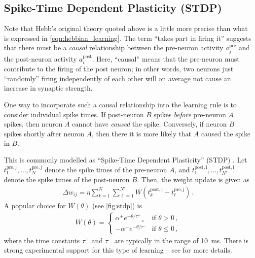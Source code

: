 \documentclass[10pt,letterpaper,oneside]{article}
\begin{document}
\subsection{Spike-Time Dependent Plasticity (STDP)}

Note that Hebb's original theory quoted above is a little more precise than what is expressed in \cref{eqn:hebbian_learning}. The term \enquote{takes part in firing it} suggests that there must be a \emph{causal} relationship between the pre-neuron activity $a_j^\mathrm{pre}$ and the post-neuron activity $a_i^\mathrm{post}$. Here, \enquote{causal} means that the pre-neuron must contribute to the firing of the post neuron; in other words, two neurons just \enquote{randomly} firing independently of each other will on average not cause an increase in synaptic strength.

One way to incorporate such a causal relationship into the learning rule is to consider individual spike times. If post-neuron $B$ spikes \emph{before} pre-neuron $A$ spikes, then neuron $A$ cannot have \emph{caused} the spike. Conversely, if neuron $B$ spikes shortly after neuron $A$, then there it is more likely that $A$ caused the spike in $B$.

This is commonly modelled as \enquote{Spike-Time Dependent Plasticity} (STDP) \cite{sjostrom2010spiketiming}. Let $t^\mathrm{pre,j}_1, \ldots, t^\mathrm{pre,j}_N$ denote the spike times of the pre-neuron $A$, and $t^\mathrm{post,i}_1, \ldots, t^\mathrm{post,i}_{N'}$ denote the spike times of the post-neuron $B$. Then, the weight update is given as
\begin{align*}
	\Delta w_{ij} = \eta \sum_{k = 1}^N \sum_{\ell = 1}^{N'} W\left(t^\mathrm{post,i}_k - t^\mathrm{pre,j}_\ell\right) \,.
\end{align*}
A popular choice for $W(\theta)$ (see \cref{fig:stdp}) is
\begin{align*}
	W(\theta) = \begin{cases}
		\alpha^+ e^{-\theta / \tau^+}¸& \text{if } \theta > 0 \,,\\
		-\alpha^- e^{-\theta / \tau^-}& \text{if } \theta \leq 0 \,,
	\end{cases}
\end{align*}
where the time constants $\tau^+$ and $\tau^-$ are typically in the range of \SI{10}{\milli\second}. There is strong experimental support for this type of learning -- see \cite{sjostrom2010spiketiming} for more details.
\end{document}
